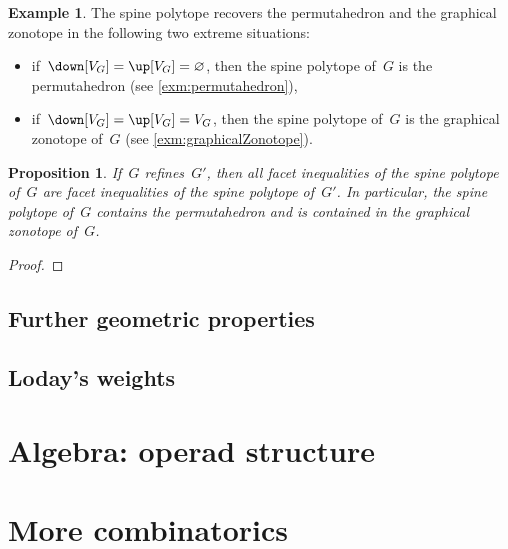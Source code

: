 \documentclass{amsart}
\newtheorem{proposition}[theorem]{Proposition}
\theoremstyle{definition}
\newtheorem{example}[theorem]{Example}
\newcommand{\vincent}[1]{\todo[color=blue!30]{#1 \\ \hfill --- V.}}
\begin{document}
\begin{example}
  \label{exm:permutahedronGraphicalZonotope}
  The spine polytope recovers the permutahedron and the graphical zonotope in the following two extreme situations:
  \begin{itemize}
    \item if~$\down[V_G] = \up[V_G] = \varnothing$, then the spine polytope of~$G$ is the permutahedron (see \cref{exm:permutahedron}),
    \item if~$\down[V_G] = \up[V_G] = V_G$, then the spine polytope of~$G$ is the graphical zonotope of~$G$ (see \cref{exm:graphicalZonotope}).
  \end{itemize}
\end{example}

\begin{proposition}
  \label{prop:refinementSpinePolytopes}
  If~$G$ refines~$G'$, then all facet inequalities of the spine polytope of~$G$ are facet inequalities of the spine polytope of~$G'$.
    In particular, the spine polytope of~$G$ contains the permutahedron and is contained in the graphical zonotope of~$G$.
\end{proposition}

\begin{proof}
  \vincent{todo}
\end{proof}


\subsection{Further geometric properties}


\subsection{Loday's weights}


\section{Algebra: operad structure}


\appendix

\section{More combinatorics}
\end{document}
